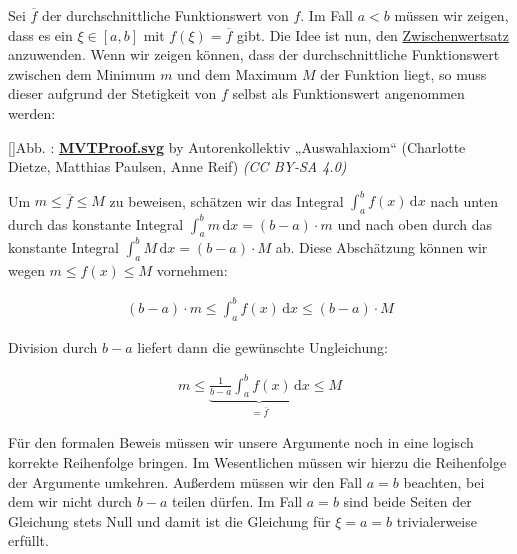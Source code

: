 \documentclass[fontsize=9pt,
               parskip=half-,
               DIV=14,
               listof=chapterentry,
               tocflat]{scrbook}
\newcounter{imagelabel}
\begin{document}
\begin{solutionprocess*}
Sei ${\overline {f}}$ der durchschnittliche Funktionswert von $f$. Im Fall $a<b$ müssen wir zeigen, dass es ein $\xi \in [a,b]$ mit $f(\xi )={\overline {f}}$ gibt. Die Idee ist nun, den \href{https://de.wikibooks.org/wiki/Mathe\_für\_Nicht-Freaks:\_Zwischenwertsatz}
{Zwischenwertsatz} anzuwenden. Wenn wir zeigen können, dass der durchschnittliche Funktionswert zwischen dem Minimum $m$ und dem Maximum $M$ der Funktion liegt, so muss dieser aufgrund der Stetigkeit von $f$ selbst als Funktionswert angenommen werden:

[]{Abb. : \protect\href{https://commons.wikimedia.org/wiki/File:MVTProof.svg}{\textbf{MVTProof.svg}} by Autorenkollektiv „Auswahlaxiom“ (Charlotte Dietze, Matthias Paulsen, Anne Reif) \textit{(CC BY-SA 4.0)}}\begin{center}
\end{center}

Um $m\leq {\overline {f}}\leq M$ zu beweisen, schätzen wir das Integral $\int _{a}^{b}f(x)\,\mathrm {d} x$ nach unten durch das konstante Integral $\int _{a}^{b}m\,\mathrm {d} x=(b-a)\cdot m$ und nach oben durch das konstante Integral $\int _{a}^{b}M\,\mathrm {d} x=(b-a)\cdot M$ ab. Diese Abschätzung können wir wegen $m\leq f(x)\leq M$ vornehmen:

\begin{align*}
(b-a)\cdot m\leq \int _{a}^{b}f(x)\,\mathrm {d} x\leq (b-a)\cdot M
\end{align*}

Division durch $b-a$ liefert dann die gewünschte Ungleichung:

\begin{align*}
m\leq \underbrace {{\frac {1}{b-a}}\int _{a}^{b}f(x)\,\mathrm {d} x} _{={\overline {f}}}\leq M
\end{align*}

Für den formalen Beweis müssen wir unsere Argumente noch in eine logisch korrekte Reihenfolge bringen. Im Wesentlichen müssen wir hierzu die Reihenfolge der Argumente umkehren. Außerdem müssen wir den Fall $a=b$ beachten, bei dem wir nicht durch $b-a$ teilen dürfen. Im Fall $a=b$ sind beide Seiten der Gleichung stets Null und damit ist die Gleichung für $\xi =a=b$ trivialerweise erfüllt.

\end{solutionprocess*}
\end{document}
